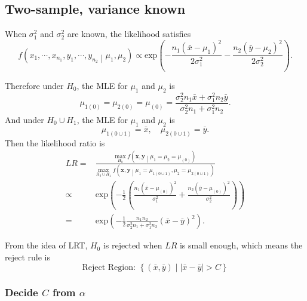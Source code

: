 \documentclass[a4paper,12pt]{article}
\begin{document}
\subsection{Two-sample, variance known}
\label{sec:two-sample-variance}
When $\sigma_1^2$ and $\sigma_2^2$ are known, the likelihood satisfies
\[
 f\left(x_1, \cdots, x_{n_1}, y_1, \cdots, y_{n_2}
   \middle|\mu_1, \mu_2\right)
 \propto
 \mathrm{exp}\left(
   -\frac{n_1\left(\bar{x} - \mu_1\right)^2}{2\sigma_1^2}
   -\frac{n_2\left(\bar{y} - \mu_2\right)^2}{2\sigma_2^2}
 \right)
 .
\]

Therefore under $H_0$, the MLE for $\mu_1$ and $\mu_2$ is
\[
  \mu_{1\left(0\right)} = \mu_{2\left(0\right)} = \mu_{\left(0\right)}
  = \frac{
    \sigma_2^2n_1\bar{x} + \sigma_1^2n_2\bar{y}
  }{
    \sigma_2^2n_1 + \sigma_1^2n_2
  }
  .
\]
And under $H_0\cup H_1$, the MLE for $\mu_1$ and $\mu_2$ is
\[
  \mu_{1\left(0\cup1\right)} = \bar{x}
  ,\quad
  \mu_{2\left(0\cup1\right)} = \bar{y}
  .
\]
Then the likelihood ratio is 
\[
  \begin{aligned}
    LR =& \frac{
            \underset{H_0}{\mathrm{max}}\;
            f\left(\bm{x}, \bm{y}\middle|\mu_1 = \mu_2 = \mu_{\left(0\right)}\right)
          }{
            \underset{H_0\cup H_1}{\mathrm{max}}\;
            f\left(\bm{x}, \bm{y}\middle|\mu_1 = \mu_{1\left(0\cup1\right)}, \mu_2 = \mu_{2\left(0\cup1\right)}\right)
          }    \\
    \propto&
             \mathrm{exp}\left(
               -\frac{1}{2}\left(
               \frac{n_1\left(\bar{x} - \mu_{\left(0\right)}\right)^2}{\sigma_1^2}
               +\frac{n_2\left(\bar{y} - \mu_{\left(0\right)}\right)^2}{\sigma_2^2}
               \right)
             \right)    \\
    =& \mathrm{exp}\left(
       -\frac{1}{2}
       \frac{n_1n_2}{\sigma_2^2n_1 + \sigma_1^2 n_2}
       \left(\bar{x} - \bar{y}\right)^2
       \right)
       .
  \end{aligned}
\]

From the idea of LRT, $H_0$ is rejected when $LR$ is small enough, which means the reject rule is
\[
  \text{Reject Region: }
  \left\{
    \left(\bar{x}, \bar{y}\right)
    \middle|
    \left|\bar{x} - \bar{y}\right| > C
  \right\}
\]

\subsubsection{Decide $C$ from $\alpha$}
\label{sec:decide-c-from-2}
\end{document}
